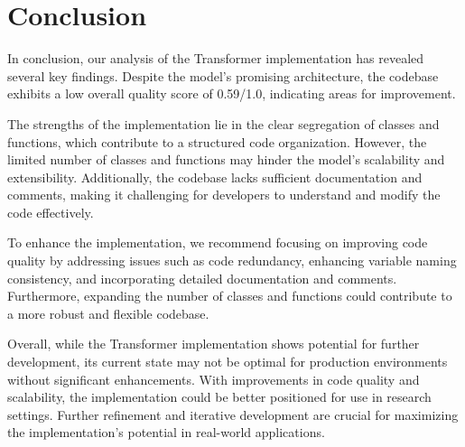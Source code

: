 \documentclass[10pt,journal,compsoc]{IEEEtran}
\begin{document}
\section{Conclusion}
In conclusion, our analysis of the Transformer implementation has revealed several key findings. Despite the model's promising architecture, the codebase exhibits a low overall quality score of 0.59/1.0, indicating areas for improvement. 

The strengths of the implementation lie in the clear segregation of classes and functions, which contribute to a structured code organization. However, the limited number of classes and functions may hinder the model's scalability and extensibility. Additionally, the codebase lacks sufficient documentation and comments, making it challenging for developers to understand and modify the code effectively.

To enhance the implementation, we recommend focusing on improving code quality by addressing issues such as code redundancy, enhancing variable naming consistency, and incorporating detailed documentation and comments. Furthermore, expanding the number of classes and functions could contribute to a more robust and flexible codebase.

Overall, while the Transformer implementation shows potential for further development, its current state may not be optimal for production environments without significant enhancements. With improvements in code quality and scalability, the implementation could be better positioned for use in research settings. Further refinement and iterative development are crucial for maximizing the implementation's potential in real-world applications.
\end{document}

